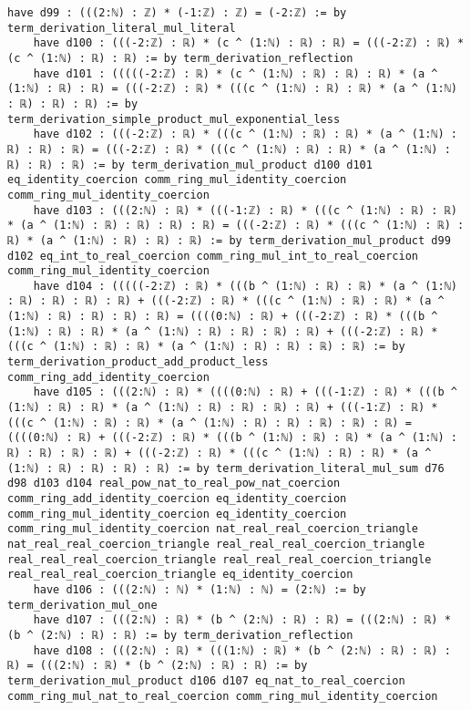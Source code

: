 \documentclass{article}
\begin{document}
\begin{tcolorbox}[colback=white!10, width=\linewidth]
\begin{lstlisting}[language=Lean4]
    have d99 : (((2:ℕ) : ℤ) * (-1:ℤ) : ℤ) = (-2:ℤ) := by term_derivation_literal_mul_literal
    have d100 : (((-2:ℤ) : ℝ) * (c ^ (1:ℕ) : ℝ) : ℝ) = (((-2:ℤ) : ℝ) * (c ^ (1:ℕ) : ℝ) : ℝ) := by term_derivation_reflection
    have d101 : (((((-2:ℤ) : ℝ) * (c ^ (1:ℕ) : ℝ) : ℝ) : ℝ) * (a ^ (1:ℕ) : ℝ) : ℝ) = (((-2:ℤ) : ℝ) * (((c ^ (1:ℕ) : ℝ) : ℝ) * (a ^ (1:ℕ) : ℝ) : ℝ) : ℝ) := by term_derivation_simple_product_mul_exponential_less
    have d102 : (((-2:ℤ) : ℝ) * (((c ^ (1:ℕ) : ℝ) : ℝ) * (a ^ (1:ℕ) : ℝ) : ℝ) : ℝ) = (((-2:ℤ) : ℝ) * (((c ^ (1:ℕ) : ℝ) : ℝ) * (a ^ (1:ℕ) : ℝ) : ℝ) : ℝ) := by term_derivation_mul_product d100 d101 eq_identity_coercion comm_ring_mul_identity_coercion comm_ring_mul_identity_coercion
    have d103 : (((2:ℕ) : ℝ) * (((-1:ℤ) : ℝ) * (((c ^ (1:ℕ) : ℝ) : ℝ) * (a ^ (1:ℕ) : ℝ) : ℝ) : ℝ) : ℝ) = (((-2:ℤ) : ℝ) * (((c ^ (1:ℕ) : ℝ) : ℝ) * (a ^ (1:ℕ) : ℝ) : ℝ) : ℝ) := by term_derivation_mul_product d99 d102 eq_int_to_real_coercion comm_ring_mul_int_to_real_coercion comm_ring_mul_identity_coercion
    have d104 : (((((-2:ℤ) : ℝ) * (((b ^ (1:ℕ) : ℝ) : ℝ) * (a ^ (1:ℕ) : ℝ) : ℝ) : ℝ) : ℝ) + (((-2:ℤ) : ℝ) * (((c ^ (1:ℕ) : ℝ) : ℝ) * (a ^ (1:ℕ) : ℝ) : ℝ) : ℝ) : ℝ) = ((((0:ℕ) : ℝ) + (((-2:ℤ) : ℝ) * (((b ^ (1:ℕ) : ℝ) : ℝ) * (a ^ (1:ℕ) : ℝ) : ℝ) : ℝ) : ℝ) + (((-2:ℤ) : ℝ) * (((c ^ (1:ℕ) : ℝ) : ℝ) * (a ^ (1:ℕ) : ℝ) : ℝ) : ℝ) : ℝ) := by term_derivation_product_add_product_less comm_ring_add_identity_coercion
    have d105 : (((2:ℕ) : ℝ) * ((((0:ℕ) : ℝ) + (((-1:ℤ) : ℝ) * (((b ^ (1:ℕ) : ℝ) : ℝ) * (a ^ (1:ℕ) : ℝ) : ℝ) : ℝ) : ℝ) + (((-1:ℤ) : ℝ) * (((c ^ (1:ℕ) : ℝ) : ℝ) * (a ^ (1:ℕ) : ℝ) : ℝ) : ℝ) : ℝ) : ℝ) = ((((0:ℕ) : ℝ) + (((-2:ℤ) : ℝ) * (((b ^ (1:ℕ) : ℝ) : ℝ) * (a ^ (1:ℕ) : ℝ) : ℝ) : ℝ) : ℝ) + (((-2:ℤ) : ℝ) * (((c ^ (1:ℕ) : ℝ) : ℝ) * (a ^ (1:ℕ) : ℝ) : ℝ) : ℝ) : ℝ) := by term_derivation_literal_mul_sum d76 d98 d103 d104 real_pow_nat_to_real_pow_nat_coercion comm_ring_add_identity_coercion eq_identity_coercion comm_ring_mul_identity_coercion eq_identity_coercion comm_ring_mul_identity_coercion nat_real_real_coercion_triangle nat_real_real_coercion_triangle real_real_real_coercion_triangle real_real_real_coercion_triangle real_real_real_coercion_triangle real_real_real_coercion_triangle eq_identity_coercion
    have d106 : (((2:ℕ) : ℕ) * (1:ℕ) : ℕ) = (2:ℕ) := by term_derivation_mul_one
    have d107 : (((2:ℕ) : ℝ) * (b ^ (2:ℕ) : ℝ) : ℝ) = (((2:ℕ) : ℝ) * (b ^ (2:ℕ) : ℝ) : ℝ) := by term_derivation_reflection
    have d108 : (((2:ℕ) : ℝ) * (((1:ℕ) : ℝ) * (b ^ (2:ℕ) : ℝ) : ℝ) : ℝ) = (((2:ℕ) : ℝ) * (b ^ (2:ℕ) : ℝ) : ℝ) := by term_derivation_mul_product d106 d107 eq_nat_to_real_coercion comm_ring_mul_nat_to_real_coercion comm_ring_mul_identity_coercion

\end{lstlisting}
\end{tcolorbox}
\end{document}
